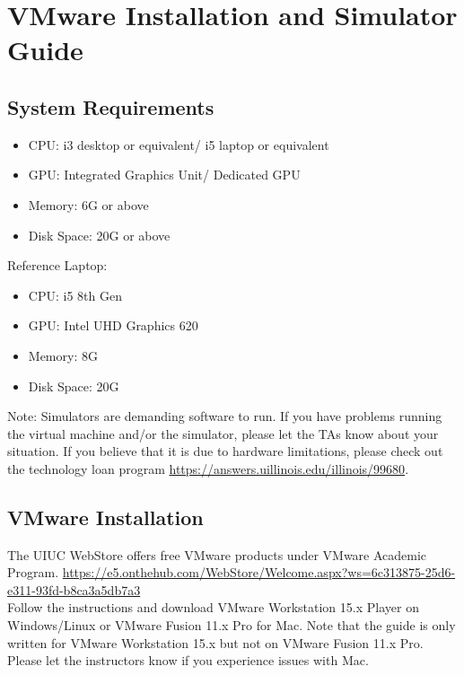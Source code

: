 \chapter{VMware Installation and Simulator Guide}

\section{System Requirements}

\begin{itemize}
    \item CPU: i3 desktop or equivalent/ i5 laptop or equivalent
    \item GPU: Integrated Graphics Unit/ Dedicated GPU
    \item Memory: 6G or above
    \item Disk Space: 20G or above
\end{itemize}

Reference Laptop:
\begin{itemize}
    \item CPU: i5 8th Gen
    \item GPU: Intel UHD Graphics 620
    \item Memory: 8G
    \item Disk Space: 20G
\end{itemize}

Note: Simulators are demanding software to run. If you have problems running the virtual machine and/or the simulator, please let the TAs know about your situation. If you believe that it is due to hardware limitations, please check out the technology loan program \url{https://answers.uillinois.edu/illinois/99680}.

\newpage

\section{VMware Installation}

The UIUC WebStore offers free VMware products under VMware Academic Program. \url{https://e5.onthehub.com/WebStore/Welcome.aspx?ws=6c313875-25d6-e311-93fd-b8ca3a5db7a3}\\

Follow the instructions and download VMware Workstation 15.x Player on Windows/Linux or VMware Fusion 11.x Pro for Mac. Note that the guide is only written for VMware Workstation 15.x but not on VMware Fusion 11.x Pro. Please let the instructors know if you experience issues with Mac.

